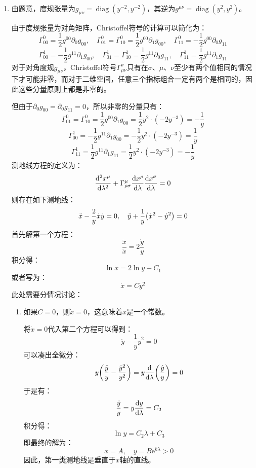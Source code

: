 \documentclass[a4paper]{article}
\DeclareMathOperator{\diag}{diag}
\begin{document}
\begin{enumerate}
    \bigskip
    \item[14.]
    由题意，度规张量为$g_{\mu\nu} = \diag(y^{-2}, y^{-2})$，其逆为$g^{\mu\nu} = \diag(y^2, y^2)$。

    由于度规张量为对角矩阵，Christoffel符号的计算可以简化为：
    \[
        \Gamma^0_{00} = \frac{1}{2} g^{00} \partial_0 g_{00},\quad \Gamma^0_{01} = \Gamma^0_{10} = \frac{1}{2} g^{00} \partial_1 g_{00},\quad \Gamma^0_{11} = - \frac{1}{2} g^{00} \partial_0 g_{11}
    \]
    \[
        \Gamma^1_{00} = -\frac{1}{2} g^{11} \partial_1 g_{00},\quad \Gamma^1_{01} = \Gamma^1_{10} = \frac{1}{2} g^{11} \partial_0 g_{11},\quad \Gamma^1_{11} = \frac{1}{2} g^{11} \partial_1 g_{11}
    \]
    对于对角度规$g_{\mu\nu}$，Christoffel符号$\Gamma^\sigma_{\mu\nu}$只有在$\sigma$、$\mu$、$\nu$至少有两个值相同的情况下才可能非零，而对于二维空间，任意三个指标组合一定有两个是相同的，因此这些分量原则上都是非零的。

    但由于$\partial_0 g_{00} = \partial_0 g_{11} = 0$，所以非零的分量只有：
    \[
        \Gamma^0_{01} = \Gamma^0_{10} = \frac{1}{2} g^{00} \partial_1 g_{00} = \frac{1}{2} y^2 \cdot (-2 y^{-3}) = -\frac{1}{y}
    \]
    \[
        \Gamma^1_{00} = -\frac{1}{2} g^{11} \partial_1 g_{00} = -\frac{1}{2} y^2 \cdot (-2 y^{-3}) = \frac{1}{y}
    \]
    \[
        \Gamma^1_{11} = \frac{1}{2} g^{11} \partial_1 g_{11} = \frac{1}{2} y^2 \cdot (-2 y^{-3}) = -\frac{1}{y}
    \]
    测地线方程的定义为：
    \[
        \dv[2]{x^\mu}{\lambda} + \Gamma^\mu_{\rho\sigma} \dv{x^\rho}{\lambda} \dv{x^\sigma}{\lambda} = 0
    \]
    则存在如下测地线：
    \[
        \ddot{x} - \frac{2}{y} \dot{x} \dot{y} = 0,\quad \ddot{y} + \frac{1}{y} \qty(\dot{x}^2 - \dot{y}^2) = 0
    \]
    首先解第一个方程：
    \[
        \frac{\ddot{x}}{\dot{x}} = 2 \frac{\dot{y}}{y}
    \]
    积分得：
    \[
        \ln{\dot{x}} = 2\ln{y} + C_1
    \]
    或者写为：
    \[
        \dot{x} = C y^2
    \]
    此处需要分情况讨论：
    \begin{enumerate}
        \item[(1)]
        如果$C = 0$，则$\dot{x} = 0$，这意味着$x$是一个常数。

        将$\dot{x} = 0$代入第二个方程可以得到：
        \[
            \ddot{y} - \frac{1}{y} \dot{y}^2 = 0
        \]
        可以凑出全微分：
        \[
            y \qty(\frac{\ddot{y}}{y} - \frac{\dot{y}^2}{y^2}) = y \dv{\lambda} \qty(\frac{\dot{y}}{y}) = 0
        \]
        于是有：
        \[
            \frac{\dot{y}}{y} = y \dv{y}{\lambda} = C_2
        \]
        积分得：
        \[
            \ln{y} = C_2 \lambda + C_3
        \]
        即最终的解为：
        \[
            x = A,\quad y = B \mathrm{e}^{k\lambda} > 0
        \]
        因此，第一类测地线是垂直于$x$轴的直线。


\end{enumerate}
\end{enumerate}
\end{document}
